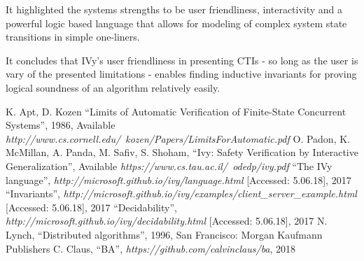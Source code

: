 \documentclass[fleqn]{article}
\begin{document}
It highlighted the systems strengths to be user friendliness, interactivity and a powerful logic based language that allows for
modeling of complex system state transitions in simple one-liners.

It concludes that IVy's user friendliness in presenting CTIs - so long as the user is vary of the presented limitations - enables
finding inductive invariants for proving logical soundness of an algorithm relatively easily.



\begin{thebibliography}{99}
     K. Apt, D. Kozen ``Limits of Automatic Verification of Finite-State Concurrent Systems'', 1986, Available \textit{http://www.cs.cornell.edu/~kozen/Papers/LimitsForAutomatic.pdf}
     O. Padon, K. McMillan, A. Panda, M. Safiv, S. Shoham, ``Ivy: Safety Verification by Interactive Generalization'', Available \textit{https://www.cs.tau.ac.il/~odedp/ivy.pdf}
     ``The IVy language'',  \textit{http://microsoft.github.io/ivy/language.html} [Accessed: 5.06.18], 2017
     ``Invariants'',  \textit{http://microsoft.github.io/ivy/examples/client\_server\_example.html} [Accessed: 5.06.18], 2017
     ``Decidability'',  \textit{http://microsoft.github.io/ivy/decidability.html} [Accessed: 5.06.18], 2017
     N. Lynch, ``Distributed algorithms'', 1996, San Francisco: Morgan Kaufmann Publishers
     C. Claus, ``BA'', \textit{https://github.com/calvinclaus/ba}, 2018
\end{thebibliography}

\end{document}
